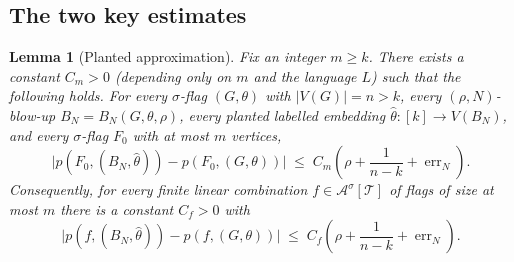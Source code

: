 \documentclass[11pt]{article}
\newtheorem{lemma}[theorem]{Lemma}
\theoremstyle{definition}
\newcommand{\A}{\mathcal{A}}
\newcommand{\T}{\mathcal{T}}
\begin{document}
\subsection{The two key estimates}

\begin{lemma}[Planted approximation]\label{lem:planted}
Fix an integer $m\ge k$.  There exists a constant $C_m>0$ (depending only
on $m$ and the language $L$) such that the following holds.  For every
$\sigma$-flag $(G,\theta)$ with $|V(G)|=n>k$, every $(\rho,N)$-blow-up
$B_N=B_N(G,\theta,\rho)$, every planted labelled embedding
$\widehat\theta\colon[k]\to V(B_N)$, and every $\sigma$-flag $F_0$ with
at most $m$ vertices,
\begin{equation}\label{eq:planted-flag-bound}
  \bigl\lvert p(F_0,(B_N,\widehat\theta))-p(F_0,(G,\theta))\bigr\rvert
  \;\le\;
  C_m\!\left(\rho+\frac1{n-k}+\operatorname{err}_N\right).
\end{equation}
Consequently, for every finite linear combination $f\in\A^\sigma[\T]$ of
flags of size at most $m$ there is a constant $C_f>0$ with
\begin{equation}\label{eq:planted-f-bound}
  \bigl\lvert p(f,(B_N,\widehat\theta))-p(f,(G,\theta))\bigr\rvert
  \;\le\;
  C_f\!\left(\rho+\frac1{n-k}+\operatorname{err}_N\right).
\end{equation}
\end{lemma}
\end{document}
